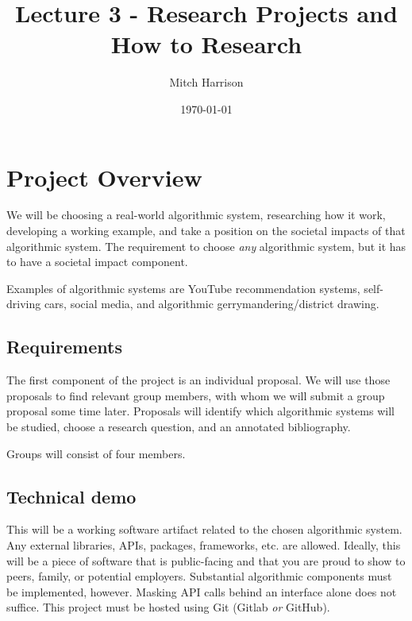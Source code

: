 \documentclass[titlepage, 12pt, leqno]{article}
\title{\Huge{Lecture 3 - Research Projects and How to Research}}
\author{\large{Mitch Harrison}}
\date{\today}
\begin{document}
\setlength{\parskip}{1\baselineskip}
\setlength{\parindent}{15pt}
\maketitle
\tableofcontents
\newpage


\section{Project Overview}

We will be choosing a real-world algorithmic system, researching how it work,
developing a working example, and take a position on the societal impacts of that
algorithmic system. The requirement to choose \textit{any} algorithmic system,
but it has to have a societal impact component. 
\begin{note}
    Examples of algorithmic systems are YouTube recommendation systems, 
    self-driving cars, social media, and algorithmic gerrymandering/district
    drawing.
\end{note}

\subsection{Requirements}

The first component of the project is an individual proposal. We will use those 
proposals to find relevant group members, with whom we will submit a group 
proposal some time later. Proposals will identify which algorithmic systems will
be studied, choose a research question, and an annotated bibliography.
\begin{note}
    Groups will consist of four members.
\end{note}

\subsection{Technical demo}

This will be a working software artifact related to the chosen algorithmic system.
Any external libraries, APIs, packages, frameworks, etc. are allowed. Ideally,
this will be a piece of software that is public-facing and that you are proud to
show to peers, family, or potential employers. Substantial algorithmic components
must be implemented, however. Masking API calls behind an interface alone does 
not suffice. This project must be hosted using Git (Gitlab \textit{or} GitHub).
\end{document}
